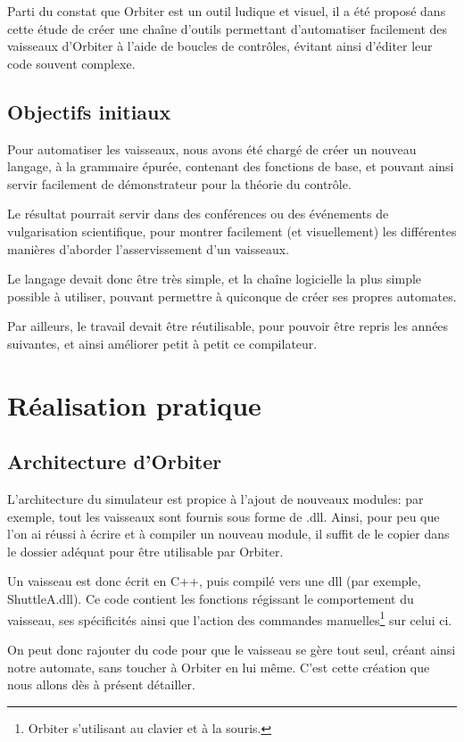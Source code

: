 \documentclass[a4paper,11pt]{article}
\begin{document}
        Parti du constat que Orbiter est un outil ludique et visuel, il a été proposé dans cette étude de créer une chaîne d'outils permettant d'automatiser facilement des vaisseaux d'Orbiter à l'aide de boucles de contrôles, évitant ainsi d'éditer leur code souvent complexe.

    \subsection{Objectifs initiaux}
        Pour automatiser les vaisseaux, nous avons été chargé de créer un nouveau langage, à la grammaire épurée, contenant des fonctions de base, et pouvant ainsi servir facilement de démonstrateur pour la théorie du contrôle.

        Le résultat pourrait servir dans des conférences ou des événements de vulgarisation scientifique, pour montrer facilement (et visuellement) les différentes manières d'aborder l'asservissement d'un vaisseaux.

        Le langage devait donc être très simple, et la chaîne logicielle la plus simple possible à utiliser, pouvant permettre à quiconque de créer ses propres automates.

        Par ailleurs, le travail devait être réutilisable, pour pouvoir être repris les années suivantes, et ainsi améliorer petit à petit ce compilateur.

\section{Réalisation pratique}
    \subsection{Architecture d'Orbiter}
        L'architecture du simulateur est propice à l'ajout de nouveaux modules: par exemple, tout les vaisseaux sont fournis sous forme de .dll. Ainsi, pour peu que l'on ai réussi à écrire et à compiler un nouveau module, il suffit de le copier dans le dossier adéquat pour être utilisable par Orbiter.
        
        Un vaisseau est donc écrit en C++, puis compilé vers une dll (par exemple, ShuttleA.dll). Ce code contient les fonctions régissant le comportement du vaisseau, ses spécificités ainsi que l'action des commandes manuelles\footnote{Orbiter s'utilisant au clavier et à la souris.} sur celui ci.
        
        On peut donc rajouter du code pour que le vaisseau se gère tout seul, créant ainsi notre automate, sans toucher à Orbiter en lui même. C'est cette création que nous allons dès à présent détailler.
\end{document}
